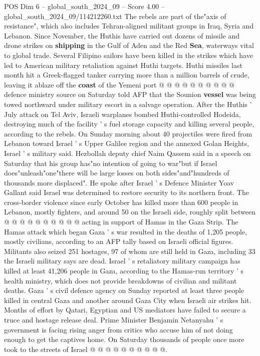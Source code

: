 \begin{textsample}{POS Dim 6 – global\_south\_2024\_09 – Score 4.00 – global\_south\_2024\_09/114212260.txt}
The rebels are part of the"axis of resistance", which also includes Tehran-aligned militant groups in Iraq, Syria and Lebanon.
Since November, the Huthis have carried out dozens of missile and drone strikes on \textbf{shipping} in the Gulf of Aden and the Red \textbf{Sea}, waterways vital to global trade.
Several Filipino sailors have been killed in the strikes which have led to American military retaliation against Huthi targets.
Huthi missiles last month hit a Greek-flagged tanker carrying more than a million barrels of crude, leaving it ablaze off the \textbf{coast} of the Yemeni port @ @ @ @ @ @ @ @ @ @ defence ministry source on Saturday told AFP that the Sounion \textbf{vessel} was being towed northward under military escort in a salvage operation.
After the Huthis ' July attack on Tel Aviv, Israeli warplanes bombed Huthi-controlled Hodeida, destroying much of the facility ' s fuel storage capacity and killing several people, according to the rebels.
On Sunday morning about 40 projectiles were fired from Lebanon toward Israel ' s Upper Galilee region and the annexed Golan Heights, Israel ' s military said.
Hezbollah deputy chief Naim Qassem said in a speech on Saturday that his group has"no intention of going to war"but if Israel does"unleash"one"there will be large losses on both sides"and"hundreds of thousands more displaced".
He spoke after Israel ' s Defence Minister Yoav Gallant said Israel was determined to restore security to its northern front.
The cross-border violence since early October has killed more than 600 people in Lebanon, mostly fighters, and around 50 on the Israeli side, roughly split between @ @ @ @ @ @ @ @ @ @ acting in support of Hamas in the Gaza Strip.
The Hamas attack which began Gaza ' s war resulted in the deaths of 1,205 people, mostly civilians, according to an AFP tally based on Israeli official figures.
Militants also seized 251 hostages, 97 of whom are still held in Gaza, including 33 the Israeli military says are dead.
Israel ' s retaliatory military campaign has killed at least 41,206 people in Gaza, according to the Hamas-run territory ' s health ministry, which does not provide breakdowns of civilian and militant deaths.
Gaza ' s civil defence agency on Sunday reported at least three people killed in central Gaza and another around Gaza City when Israeli air strikes hit.
Months of effort by Qatari, Egyptian and US mediators have failed to secure a truce and hostage release deal.
Prime Minister Benjamin Netanyahu ' s government is facing rising anger from critics who accuse him of not doing enough to get the captives home.
On Saturday thousands of people once more took to the streets of Israel @ @ @ @ @ @ @ @ @ @.

\end{textsample}
